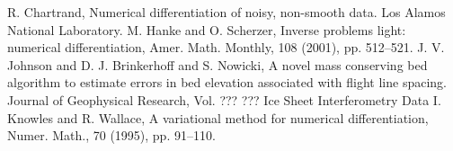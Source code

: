 \documentclass{homework}
\begin{document}
\begin{thebibliography}{[99]}
 R. Chartrand, Numerical differentiation of noisy, non-smooth data. Los Alamos National Laboratory.
 M. Hanke and O. Scherzer, Inverse problems light: numerical differentiation, Amer. Math. Monthly, 108 (2001), pp. 512–521.
 J. V. Johnson and D. J. Brinkerhoff and S. Nowicki, A novel mass conserving bed algorithm to estimate errors in bed elevation associated with flight line spacing. Journal of Geophysical Research, Vol. ??? 
 ??? Ice Sheet Interferometry Data
 I. Knowles and R. Wallace, A variational method for numerical differentiation, Numer. Math., 70 (1995), pp. 91–110.  
\end{thebibliography}
\end{document}
